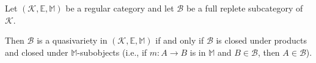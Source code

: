 Let $(\mathcal{K}, \mathbb{E}, \mathbb{M})$ be a regular category and let $\mathcal{B}$ be a full replete subcategory of $\mathcal{K}$.

Then $\mathcal{B}$ is a quasivariety in $(\mathcal{K}, \mathbb{E}, \mathbb{M})$ if and only if $\mathcal{B}$ is closed under products and closed under $\mathbb{M}$-subobjects (i.e., if $m: A \longrightarrow B$ is in $\mathbb{M}$ and $B \in \mathcal{B}$, then $A \in \mathcal{B}$).
